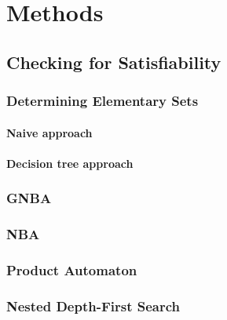 \section{Methods}
\subsection{Checking for Satisfiability}

\subsubsection{Determining Elementary Sets}
\paragraph{Naive approach}
\paragraph{Decision tree approach}

\subsubsection{GNBA}

\subsubsection{NBA}

\subsubsection{Product Automaton}

\subsubsection{Nested Depth-First Search}
